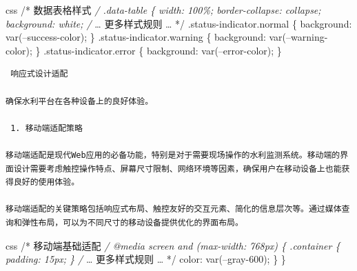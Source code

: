 css /* 数据表格样式 \emph{/ .data-table \{ width: 100\%; border-collapse: collapse; background: white; /} \ldots{} 更多样式规则 \ldots{} */ .status-indicator.normal \{ background: var(--success-color); \} .status-indicator.warning \{ background: var(--warning-color); \} .status-indicator.error \{ background: var(--error-color); \}

\begin{lstlisting}
 响应式设计适配

确保水利平台在各种设备上的良好体验。

 1. 移动端适配策略

移动端适配是现代Web应用的必备功能，特别是对于需要现场操作的水利监测系统。移动端的界面设计需要考虑触控操作特点、屏幕尺寸限制、网络环境等因素，确保用户在移动设备上也能获得良好的使用体验。

移动端适配的关键策略包括响应式布局、触控友好的交互元素、简化的信息层次等。通过媒体查询和弹性布局，可以为不同尺寸的移动设备提供优化的界面布局。
\end{lstlisting}

css /* 移动端基础适配 \emph{/ @media screen and (max-width: 768px) \{ .container \{ padding: 15px; \} /} \ldots{} 更多样式规则 \ldots{} */ color: var(--gray-600); \} \}

